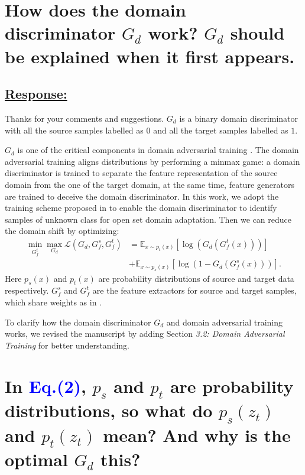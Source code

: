 \section{How does the domain discriminator $G_d$ work? $G_d$ should be explained when it first appears.}

\subsection*{\underline{\textbf{Response:}}}

Thanks for your comments and suggestions.
$G_d$ is a binary domain discriminator with all the source samples labelled as $0$ and all the target samples labelled as $1$.

$G_d$ is one of the critical components in domain adversarial training \cite{DomainAdversrialNetwork,ADDA,OpensetDA-bp}.
The domain adversarial training aligns distributions by performing a minmax game: a domain discriminator is trained to separate the feature representation of the source domain from the one of the target domain, at the same time, feature generators are trained to deceive the domain discriminator.
In this work, we adopt the training scheme proposed in \cite{OpensetDA-bp} to enable the domain discriminator to identify samples of unknown class for open set domain adaptation. 
Then we can reduce the domain shift by optimizing:
\begin{equation}
    \label{eq: training DANN}
    \begin{split}
        \min_{G_f^t} \max_{G_d} \mathscr{L}(G_d,G^{s}_{f},G_f^t) &=\mathbb{E}_{x\sim p_t(x)} \left[ \log \left(G_d\left(G_f^t\left(x\right)\right)\right) \right]\\
        &+\mathbb{E}_{x\sim p_s(x)}\left[ \log \left(1-G_d\left(G_f^s\left(x\right)\right)\right) \right].
    \end{split}
\end{equation}
Here $p_s (x)$ and $p_t (x)$ are probability distributions of source and target data respectively.
$G_f^s$ and $G_f^t$ are the feature extractors for source and target samples, which share weights as in \cite{OpensetDA-bp}.

To clarify how the domain discriminator $G_d$ and domain adversarial training works, we revised the manuscript by adding Section \textit{3.2: Domain Adversarial Training} for better understanding.


\section{In \textcolor{blue}{Eq.(2)}, $p_s$ and $p_t$ are probability distributions, so what do $p_s (z_t)$ and $p_t (z_t)$ mean? And why is the optimal $G_d$ this? }
